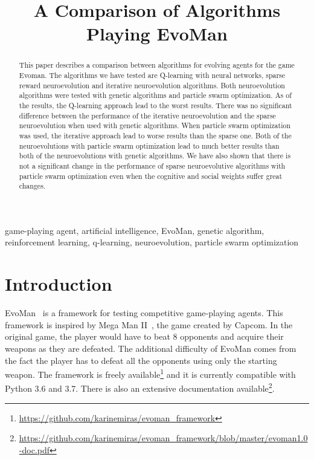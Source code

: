 \documentclass[conference]{IEEEtran}
\begin{document}
\title{A Comparison of Algorithms Playing EvoMan}

\author{
\and
}

\maketitle

\begin{abstract}
This paper describes a comparison between algorithms for
evolving agents for the game Evoman.
The algorithms we have tested are Q-learning with neural networks, sparse reward neuroevolution and
iterative neuroevolution algorithms.
Both neuroevolution algorithms were tested with genetic algorithms and particle swarm optimization.
As of the results, the Q-learning approach lead to the worst results.
There was no significant difference between the performance of the iterative neuroevolution
and the sparse neuroevolution when used with genetic algorithms.
When particle swarm optimization was used, the iterative approach lead to worse results than the sparse one.
Both of the neuroevolutions with particle swarm optimization lead to much better results than both of the
neuroevolutions with genetic algorithms.
We have also shown that there is not a significant change in the performance of sparse neuroevolutive
algorithms with particle swarm optimization even when the cognitive and social weights suffer great changes.
\end{abstract}

\begin{IEEEkeywords}
game-playing agent, artificial intelligence, EvoMan, genetic algorithm, reinforcement learning,
q-learning, neuroevolution, particle swarm optimization
\end{IEEEkeywords}

\section{Introduction}\label{sec:introduction}
EvoMan~\cite{karinemiras,evoman} is a framework for testing competitive game-playing agents.
This framework is inspired by Mega Man II~\cite{capcom}, the game created by Capcom.
In the original game, the player would have to beat $8$ opponents and acquire their weapons
as they are defeated.
The additional difficulty of EvoMan comes from the fact the player has to defeat all
the opponents using only the starting weapon.
The framework is freely available\footnote{\url{https://github.com/karinemiras/evoman_framework}}
and it is currently compatible with Python 3.6 and 3.7.
There is also an extensive documentation
available\footnote{\url{https://github.com/karinemiras/evoman_framework/blob/master/evoman1.0-doc.pdf}}.
\end{document}
